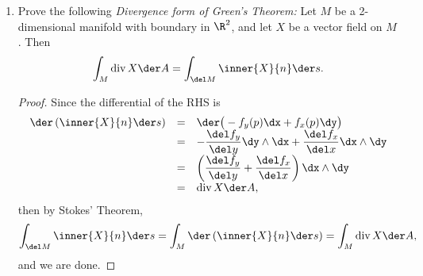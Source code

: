 \documentclass[letterpaper]{article}
\begin{document}
\begin{enumerate}
\begin{enumerate}
\begin{proof}
\[\begin{array}{rcl}
	+
	\det 
			\left[\begin{array}{cc}
			|&|\\
			\inner{X_p}{N_p}N_p & v\\
			|&|\\
			\end{array}\right]
	\\
	&=& 0 + \inner{X_p}{N_p}
	\det 
			\left[\begin{array}{cc}
			|&|\\
			N_p & v\\
			|&|\\
			\end{array}\right]
	\\
	&=&\inner{X_p}{N_p}\der s
	\end{array}\]
	and we are done. 
	\end{proof}
	
	\item Prove the following \emph{Divergence form of Green's Theorem:}	Let $M$ be a 2-dimensional manifold with boundary in $\R^2$, and let $X$ be a vector field on $M$. Then 
	$$\int_{M}\text{div}\,X\der A = \int_{\del M}\inner{X}{n}\der s.$$
	\begin{proof}
	Since the differential of the RHS is
	\[\begin{array}{rcl}
	\der\left(\inner{X}{n}\der s\right) &=& \der\big(-f_y(p)\dx+f_x(p)\dy\big)\\
	&=&-\dfrac{\del f_y}{\del y}\dy\wedge\dx+\dfrac{\del f_x}{\del x}\dx\wedge\dy\\
	&=&\left(\dfrac{\del f_y}{\del y}+\dfrac{\del f_x}{\del x}\right)\dx\wedge\dy\\
	&=&\text{div}\,X\der A,
	\end{array}\]
	then by Stokes' Theorem, 
	$$\int_{\del M}\inner{X}{n}\der s = \int_{M}\der\left(\inner{X}{n}\der s\right) = \int_{M}\text{div}\,X\der A,$$
	and we are done. 
	\end{proof}
	\end{enumerate}


\end{enumerate}
\end{document}
